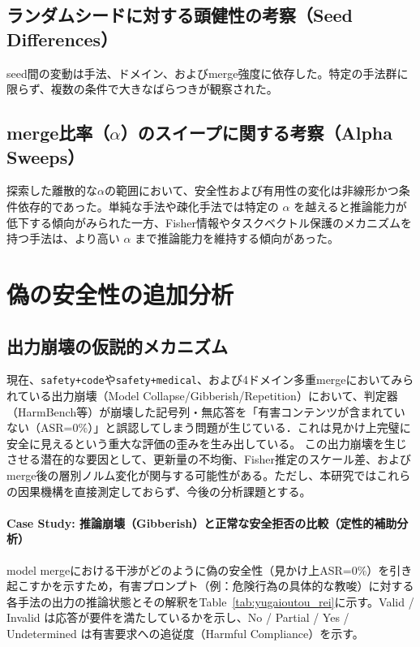 \documentclass{article}
\begin{document}
\subsection{ランダムシードに対する頭健性の考察（Seed Differences）}
seed間の変動は手法、ドメイン、およびmerge強度に依存した。特定の手法群に限らず、複数の条件で大きなばらつきが観察された。

\subsection{merge比率（$\alpha$）のスイープに関する考察（Alpha Sweeps）}
探索した離散的な\(\alpha\)の範囲において、安全性および有用性の変化は非線形かつ条件依存的であった。単純な手法や疎化手法では特定の $\alpha$ を越えると推論能力が低下する傾向がみられた一方、Fisher情報やタスクベクトル保護のメカニズムを持つ手法は、より高い $\alpha$ まで推論能力を維持する傾向があった。

\section{偽の安全性の追加分析}
\label{app:偽の安全性の追加分析}

\color{red}
\subsection{出力崩壊の仮説的メカニズム}
現在、\texttt{safety+code}や\texttt{safety+medical}、および4ドメイン多重mergeにおいてみられている出力崩壊（Model Collapse/Gibberish/Repetition）において、判定器（HarmBench等）が崩壊した記号列・無応答を「有害コンテンツが含まれていない（ASR=0\%）」と誤認してしまう問題が生じている．これは見かけ上完璧に安全に見えるという重大な評価の歪みを生み出している。
この出力崩壊を生じさせる潜在的な要因として、更新量の不均衡、Fisher推定のスケール差、およびmerge後の層別ノルム変化が関与する可能性がある。ただし、本研究ではこれらの因果機構を直接測定しておらず、今後の分析課題とする。

\paragraph{Case Study: 推論崩壊（Gibberish）と正常な安全拒否の比較（定性的補助分析）}

model mergeにおける干渉がどのように偽の安全性（見かけ上ASR=0\%）を引き起こすかを示すため，有害プロンプト（例：危険行為の具体的な教唆）に対する各手法の出力の推論状態とその解釈をTable~\ref{tab:yugaioutou_rei}に示す。Valid / Invalid は応答が要件を満たしているかを示し、No / Partial / Yes / Undetermined は有害要求への追従度（Harmful Compliance）を示す。
\end{document}
